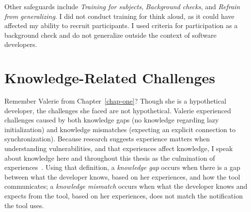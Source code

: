 Other safeguards include \textit{Training for subjects}, \textit{Background checks}, and \textit{Refrain from generalizing}. I did not conduct training for think aloud, as it could have affected my ability to recruit participants. I used criteria for participation as a background check and do not generalize outside the context of software developers.

\def\toggle{
	\begin{scope}[ocg={name=test2, ref=t2, status=visible}]
		\node[inner sep=0pt] (svgPDF) at (0,0)
		{\texttt{[image: Chapter-4/figs/Issues\_Full.pdf]}};
	\end{scope}
	\begin{scope}[ocg={name=test1, ref=t1, status=invisible}]
		\node[inner sep=0pt] (svgPDF) at (0,0)
		{\texttt{[image: Chapter-4/figs/Issues\_Challenges.pdf]}};
	\end{scope}
	\node[draw,switch ocg={t1 t2}] at (0,-6.8) {Hide/Display Details};
}



\section{Knowledge-Related Challenges}

Remember Valerie from Chapter~\ref{chap-one}? Though she is a hypothetical developer, the challenges she faced are not hypothetical. Valerie experienced challenges caused by both knowledge gaps (no knowledge regarding lazy initialization) and knowledge mismatches (expecting an explicit connection to synchronization). 
Because research suggests experience matters when understanding vulnerabilities, and that experiences affect knowledge, I speak about knowledge here and throughout this thesis as the culmination of experiences~\cite{johnson1989mental,argote2011organizational,baca2009static}.
Using that definition, a \emph{knowledge gap} occurs when there is a gap between what the developer knows, based on her experiences, and how the tool communicates; a \emph{knowledge mismatch} occurs when what the developer knows and expects from the tool, based on her experiences, does not match the notification the tool uses.

